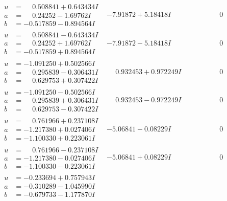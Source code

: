 \documentclass[1p]{elsarticle_modified}
\theoremstyle{definition}
\begin{document}
$$\begin{array}{c|c|c}
\begin{aligned}
u &= \phantom{-}0.508841 + 0.643434 I \\
a &= \phantom{-}0.24252 - 1.69762 I \\
b &= -0.517859 - 0.894564 I\end{aligned}
 & -7.91872 + 5.18418 I & \phantom{-0.000000 } 0 \\ \hline\begin{aligned}
u &= \phantom{-}0.508841 - 0.643434 I \\
a &= \phantom{-}0.24252 + 1.69762 I \\
b &= -0.517859 + 0.894564 I\end{aligned}
 & -7.91872 - 5.18418 I & \phantom{-0.000000 } 0 \\ \hline\begin{aligned}
u &= -1.091250 + 0.502566 I \\
a &= \phantom{-}0.295839 - 0.306431 I \\
b &= \phantom{-}0.629753 + 0.307422 I\end{aligned}
 & \phantom{-}0.932453 + 0.972249 I & \phantom{-0.000000 } 0 \\ \hline\begin{aligned}
u &= -1.091250 - 0.502566 I \\
a &= \phantom{-}0.295839 + 0.306431 I \\
b &= \phantom{-}0.629753 - 0.307422 I\end{aligned}
 & \phantom{-}0.932453 - 0.972249 I & \phantom{-0.000000 } 0 \\ \hline\begin{aligned}
u &= \phantom{-}0.761966 + 0.237108 I \\
a &= -1.217380 + 0.027406 I \\
b &= -1.100330 + 0.223061 I\end{aligned}
 & -5.06841 - 0.08229 I & \phantom{-0.000000 } 0 \\ \hline\begin{aligned}
u &= \phantom{-}0.761966 - 0.237108 I \\
a &= -1.217380 - 0.027406 I \\
b &= -1.100330 - 0.223061 I\end{aligned}
 & -5.06841 + 0.08229 I & \phantom{-0.000000 } 0 \\ \hline\begin{aligned}
u &= -0.233694 + 0.757943 I \\
a &= -0.310289 - 1.045990 I \\
b &= -0.679733 - 1.177870 I\end{aligned}

\end{array}$$
\end{document}

